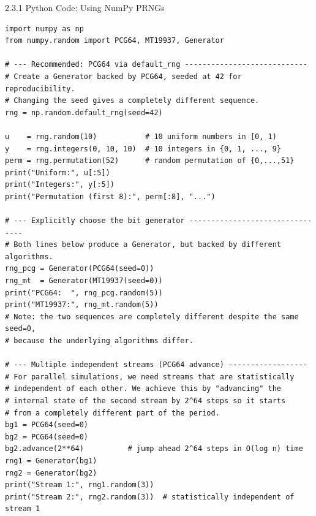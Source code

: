 \documentclass[aspectratio=169,10pt]{beamer}
\begin{document}
\begin{frame}[fragile]{2.3.1 Python Code: Using NumPy PRNGs}

\begin{lstlisting}[style=python]
import numpy as np
from numpy.random import PCG64, MT19937, Generator

# --- Recommended: PCG64 via default_rng ----------------------------
# Create a Generator backed by PCG64, seeded at 42 for reproducibility.
# Changing the seed gives a completely different sequence.
rng = np.random.default_rng(seed=42)

u    = rng.random(10)           # 10 uniform numbers in [0, 1)
y    = rng.integers(0, 10, 10)  # 10 integers in {0, 1, ..., 9}
perm = rng.permutation(52)      # random permutation of {0,...,51}
print("Uniform:", u[:5])
print("Integers:", y[:5])
print("Permutation (first 8):", perm[:8], "...")

# --- Explicitly choose the bit generator --------------------------------
# Both lines below produce a Generator, but backed by different algorithms.
rng_pcg = Generator(PCG64(seed=0))
rng_mt  = Generator(MT19937(seed=0))
print("PCG64:  ", rng_pcg.random(5))
print("MT19937:", rng_mt.random(5))
# Note: the two sequences are completely different despite the same seed=0,
# because the underlying algorithms differ.

# --- Multiple independent streams (PCG64 advance) ------------------
# For parallel simulations, we need streams that are statistically
# independent of each other. We achieve this by "advancing" the
# internal state of the second stream by 2^64 steps so it starts
# from a completely different part of the period.
bg1 = PCG64(seed=0)
bg2 = PCG64(seed=0)
bg2.advance(2**64)          # jump ahead 2^64 steps in O(log n) time
rng1 = Generator(bg1)
rng2 = Generator(bg2)
print("Stream 1:", rng1.random(3))
print("Stream 2:", rng2.random(3))  # statistically independent of stream 1
\end{lstlisting}

\end{frame}
\end{document}
